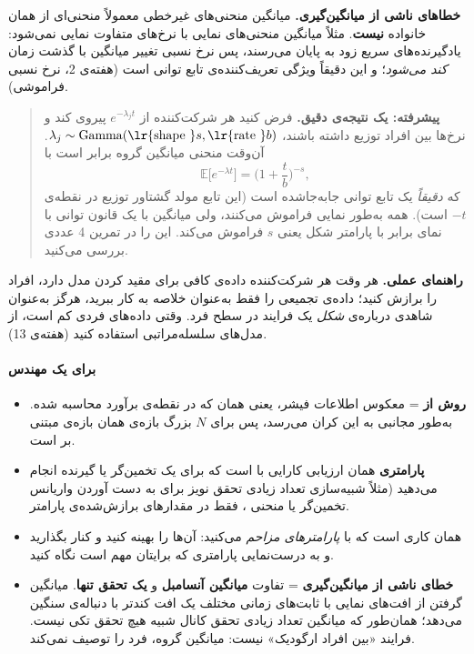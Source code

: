 \textbf{خطاهای ناشی از میانگین‌گیری.} میانگین منحنی‌های غیرخطی معمولاً
منحنی‌ای از همان خانواده \textbf{نیست}. مثلاً میانگین منحنی‌های نمایی با
نرخ‌های متفاوت نمایی نمی‌شود: یادگیرنده‌های سریع زود به پایان می‌رسند، پس
نرخ نسبی تغییر میانگین با گذشت زمان \emph{کند می‌شود}؛ و این دقیقاً ویژگی
تعریف‌کننده‌ی تابع توانی است (هفته‌ی 2، نرخ نسبی فراموشی).

\begin{quote}
\textbf{پیشرفته: یک نتیجه‌ی دقیق.} فرض کنید هر شرکت‌کننده از
\(e^{-\lambda_j t}\) پیروی کند و نرخ‌ها بین افراد توزیع  داشته
باشند،
\(\lambda_j \sim \mathrm{Gamma}(\text{\lr{shape }} s, \text{\lr{rate }} b)\).
آن‌وقت منحنی میانگین گروه برابر است با
\[\mathbb{E}\big[e^{-\lambda t}\big] = \Big(1 + \frac{t}{b}\Big)^{-s},\]
که \emph{دقیقاً} یک تابع توانی جابه‌جاشده است (این تابع مولد گشتاور توزیع
 در نقطه‌ی \(-t\) است). همه به‌طور نمایی فراموش می‌کنند، ولی
میانگین با یک قانون توانی با نمای برابر با پارامتر شکل  یعنی
\(s\) فراموش می‌کند. این را در تمرین 4 عددی بررسی می‌کنید.
\end{quote}

\textbf{راهنمای عملی.} هر وقت هر شرکت‌کننده داده‌ی کافی برای مقید کردن مدل
دارد، افراد را برازش کنید؛ داده‌ی تجمیعی را فقط به‌عنوان خلاصه به کار
ببرید، هرگز به‌عنوان شاهدی درباره‌ی \emph{شکل} یک فرایند در سطح فرد. وقتی
داده‌های فردی کم است، از مدل‌های سلسله‌مراتبی استفاده کنید (هفته‌ی 13).

\paragraph{برای یک مهندس}

\begin{itemize}
\tightlist
\item
  \textbf{ روش  از } = معکوس اطلاعات فیشر،
  یعنی همان \textbf{} که در نقطه‌ی برآورد محاسبه شده. 
  به‌طور مجانبی به این کران می‌رسد، پس برای \(N\) بزرگ بازه‌ی 
  همان بازه‌ی مبتنی بر  است.
\item
  \textbf{ پارامتری} همان ارزیابی کارایی با  است که برای یک تخمین‌گر یا گیرنده انجام می‌دهید (مثلاً شبیه‌سازی
  تعداد زیادی تحقق نویز برای به دست آوردن واریانس تخمین‌گر یا منحنی
  ، فقط در مقدارهای برازش‌شده‌ی پارامتر.
\item
  \textbf{} همان کاری است که با \emph{پارامترهای
  مزاحم } می‌کنید: آن‌ها را بهینه کنید و کنار
  بگذارید و به درست‌نمایی پارامتری که برایتان مهم است نگاه کنید.
\item
  \textbf{خطای ناشی از میانگین‌گیری} = تفاوت \textbf{میانگین آنسامبل} و
  \textbf{یک تحقق تنها}. میانگین گرفتن از افت‌های نمایی با ثابت‌های زمانی
  مختلف یک افت کندتر با دنباله‌ی سنگین می‌دهد؛ همان‌طور که میانگین تعداد
  زیادی تحقق کانال شبیه هیچ تحقق تکی نیست. فرایند «بین افراد ارگودیک»
  نیست: میانگین گروه، فرد را توصیف نمی‌کند.
\end{itemize}

